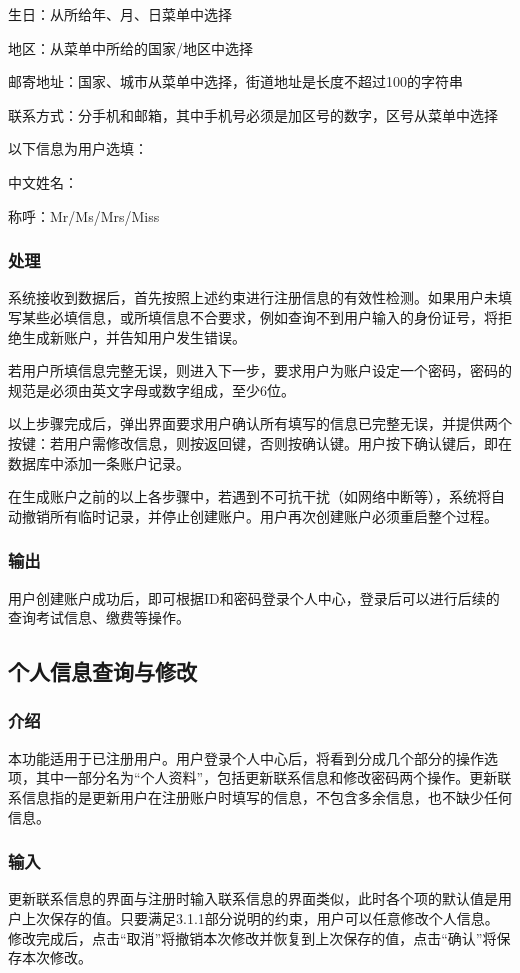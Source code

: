 	生日：从所给年、月、日菜单中选择

	地区：从菜单中所给的国家/地区中选择

	邮寄地址：国家、城市从菜单中选择，街道地址是长度不超过100的字符串

	联系方式：分手机和邮箱，其中手机号必须是加区号的数字，区号从菜单中选择

以下信息为用户选填：

	中文姓名：

	称呼：Mr/Ms/Mrs/Miss

\subsubsection{处理}
系统接收到数据后，首先按照上述约束进行注册信息的有效性检测。如果用户未填写某些必填信息，或所填信息不合要求，例如查询不到用户输入的身份证号，将拒绝生成新账户，并告知用户发生错误。

若用户所填信息完整无误，则进入下一步，要求用户为账户设定一个密码，密码的规范是必须由英文字母或数字组成，至少6位。

以上步骤完成后，弹出界面要求用户确认所有填写的信息已完整无误，并提供两个按键：若用户需修改信息，则按返回键，否则按确认键。用户按下确认键后，即在数据库中添加一条账户记录。

在生成账户之前的以上各步骤中，若遇到不可抗干扰（如网络中断等），系统将自动撤销所有临时记录，并停止创建账户。用户再次创建账户必须重启整个过程。

\subsubsection{输出}
用户创建账户成功后，即可根据ID和密码登录个人中心，登录后可以进行后续的查询考试信息、缴费等操作。

\subsection{个人信息查询与修改}

\subsubsection{介绍}
本功能适用于已注册用户。用户登录个人中心后，将看到分成几个部分的操作选项，其中一部分名为“个人资料”，包括更新联系信息和修改密码两个操作。更新联系信息指的是更新用户在注册账户时填写的信息，不包含多余信息，也不缺少任何信息。

\subsubsection{输入}
更新联系信息的界面与注册时输入联系信息的界面类似，此时各个项的默认值是用户上次保存的值。只要满足3.1.1部分说明的约束，用户可以任意修改个人信息。修改完成后，点击“取消”将撤销本次修改并恢复到上次保存的值，点击“确认”将保存本次修改。

